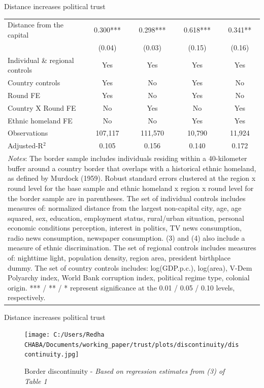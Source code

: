 \documentclass[10pt]{beamer}
\begin{document}
\begin{frame}{Distance increases political trust}
\begin{table}[H]
{\begin{tabular}{@{\extracolsep{5pt}} l c c c c}
         Distance from the capital&       0.300***&       0.298***&       0.618***&       0.341** \\
         \smallskip
         &      (0.04)   &      (0.03)   &      (0.15)   &      (0.16)   \\
         \midrule
         \smallskip
        Individual \& regional controls  & Yes & Yes & Yes & Yes  \\
        \smallskip
        Country controls & Yes& No& Yes& No\\
        \smallskip
        Round FE & Yes & No& Yes & No\\
        \smallskip
        Country X Round FE       & No & Yes& No & Yes\\
        \smallskip
        Ethnic homeland FE & No & No & Yes& Yes\\
        \smallskip
        Observations           &      107,117   &      111,570   &       10,790   &       11,924   \\
        Adjusted-R$^2$         &       0.105   &       0.156   &       0.140   &       0.172   \\
                              \bottomrule
        \multicolumn{5}{p{12.5cm}}{\footnotesize \emph{Notes}: The border sample includes individuals residing within a 40-kilometer buffer around a country border that overlaps with a historical ethnic homeland, as defined by Murdock (1959). Robust standard errors clustered at the region x round level  for the base sample and ethnic homeland x region x round level for the border sample are in parentheses. The set of individual controls
        includes measures of: normalized distance from the largest non-capital city, age, age squared, sex,
        education, employment status, rural/urban situation, personal economic conditions perception, interest in politics, TV news consumption, radio news consumption, newspaper consumption. (3) and (4) also include a measure of ethnic discrimination. The set of regional controls includes measures of: nighttime light, population density, region area, president birthplace dummy. The set of country controls includes: log(GDP.p.c.), log(area), V-Dem Polyarchy index, World Bank corruption index, political regime type, colonial origin. *** / ** / * represent significance at the 0.01 / 0.05 / 0.10 levels, respectively.}
        \end{tabular}
        }
        \end{table}
        \end{frame}

\begin{frame}{Distance increases political trust}

\begin{figure}
    \texttt{[image: C:/Users/Redha CHABA/Documents/working\_paper/trust/plots/discontinuity/discontinuity.jpg]}
    \caption{Border discontinuity - \textit{Based on regression estimates from (3) of Table 1}}
\end{figure}

\end{frame}
\end{document}
